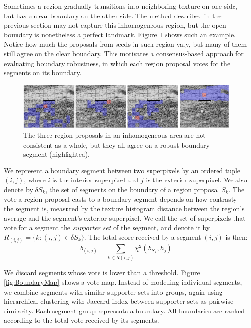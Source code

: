 \documentclass{llncs}
\begin{document}
Sometimes a region gradually transitions into neighboring texture on one side, but has a clear boundary on the other side. The method described in the previous section may not capture this inhomogeneous region, but the open boundary is nonetheless a perfect landmark. Figure \ref{fig:RobustBoundaryExample} shows such an example. Notice how much the proposals from seeds in such region vary, but many of them still agree on the clear boundary. This motivates a consensus-based approach for evaluating boundary robustness, in which each region proposal votes for the segments on its boundary.

\begin{figure}
	\includegraphics[width=\textwidth]{../figures/RobustBoundaryExampleHighlightLine.png}
	\caption{The three region proposals in an inhomogeneous area are not consistent as a whole, but they all agree on a robust boundary segment (highlighted).}
	\label{fig:RobustBoundaryExample}
\end{figure}

We represent a boundary segment between two superpixels by an ordered tuple $(i,j)$, where $i$ is the interior superpixel and $j$ is the exterior superpixel. We also denote by $\delta S_k$, the set of segments on the boundary of a region proposal $S_k$. 
The vote a region proposal casts to a boundary segment depends on how contrasty the segment is, measured by the texture histogram distance between the region's average and the segment's exterior superpixel. We call the set of superpixels that vote for a segment the \textit{supporter set} of the segment, and denote it by $R_{(i,j)} = \{k: (i,j) \in \delta S_k\}$. The total score received by a segment $(i,j)$ is then: 
$$ b_{(i,j)} = \sum_{k \in R(i,j)} \chi^2(h_{S_k}, h_j)$$

We discard segments whose vote is lower than a threshold. Figure \ref{fig:BoundaryMap} shows a vote map. Instead of modelling individual segments, we combine segments with similar supporter sets into groups, again using hierarchical clustering with Jaccard index between supporter sets as pairwise similarity. Each segment group represents a boundary. All boundaries are ranked according to the total vote received by its segments. 
\end{document}
